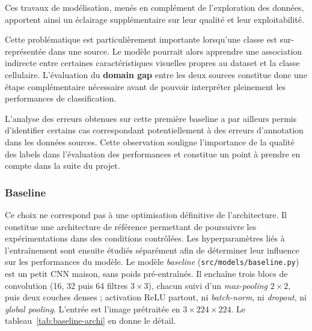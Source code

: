 Ces travaux de modélisation, menés en complément de l’exploration des données, apportent ainsi un éclairage supplémentaire sur leur qualité et leur exploitabilité.

Cette problématique est particulièrement importante lorsqu’une classe est sur-représentée dans une source.
Le modèle pourrait alors apprendre une association indirecte entre certaines caractéristiques visuelles propres au dataset et la classe cellulaire.
L’évaluation du \textbf{domain gap} entre les deux sources constitue donc une étape complémentaire nécessaire avant de pouvoir interpréter pleinement les performances de classification.

L’analyse des erreurs obtenues sur cette première baseline a par ailleurs permis d’identifier certains cas correspondant potentiellement à des erreurs d’annotation dans les données sources.
Cette observation souligne l’importance de la qualité des labels dans l’évaluation des performances et constitue un point à prendre en compte dans la suite du projet.

\subsubsection{Baseline}
\label{sec:baseline}

Ce choix ne correspond pas à une optimisation définitive de l'architecture.
Il constitue une architecture de référence permettant de poursuivre les expérimentations dans des conditions contrôlées.
Les hyperparamètres liés à l'entraînement sont ensuite étudiés séparément afin de déterminer leur influence sur les performances du modèle.
Le modèle \emph{baseline} (\texttt{src/models/baseline.py}) est un petit CNN maison, sans poids pré-entraînés.
Il enchaîne trois blocs de convolution (16, 32 puis 64 filtres $3 \times 3$), chacun suivi d’un \emph{max-pooling} $2 \times 2$, puis deux couches denses ; activation ReLU partout, ni \emph{batch-norm}, ni \emph{dropout}, ni \emph{global pooling}.
L’entrée est l’image prétraitée en $3 \times 224 \times 224$.
Le tableau~\ref{tab:baseline-archi} en donne le détail.

